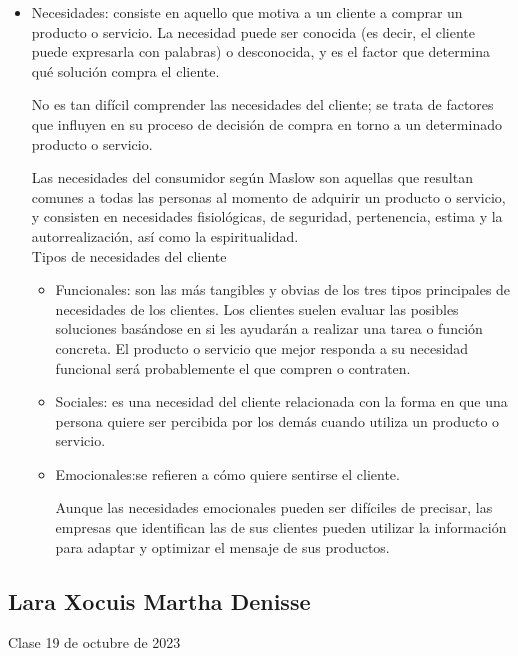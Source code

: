 \documentclass[letterpaper,12pt]{article}
\begin{document}
\begin{sloppypar}
\begin{itemize}
    \item Necesidades:  consiste en aquello que motiva a un cliente a comprar un producto o servicio. La necesidad puede ser conocida (es decir, el cliente puede expresarla con palabras) o desconocida, y es el factor que determina qué solución compra el cliente.
    
    No es tan difícil comprender las necesidades del cliente; se trata de factores que influyen en su proceso de decisión de compra en torno a un determinado producto o servicio.

    Las necesidades del consumidor según Maslow son aquellas que resultan comunes a todas las personas al momento de adquirir un producto o servicio, y consisten en necesidades fisiológicas, de seguridad, pertenencia, estima y la autorrealización, así como la espiritualidad.
    \vspace{0.3cm}\\ 
    Tipos de necesidades del cliente 
    \begin{itemize}
        \item Funcionales: son las más tangibles y obvias de los tres tipos principales de necesidades de los clientes. Los clientes suelen evaluar las posibles soluciones basándose en si les ayudarán a realizar una tarea o función concreta. El producto o servicio que mejor responda a su necesidad funcional será probablemente el que compren o contraten.
        \item Sociales:  es una necesidad del cliente relacionada con la forma en que una persona quiere ser percibida por los demás cuando utiliza un producto o servicio. 
        \item Emocionales:se refieren a cómo quiere sentirse el cliente.

        Aunque las necesidades emocionales pueden ser difíciles de precisar, las empresas que identifican las de sus clientes pueden utilizar la información para adaptar y optimizar el mensaje de sus productos.
    \end{itemize}

\end{itemize}
\newpage
\subsection*{Lara Xocuis Martha Denisse}
Clase 19 de octubre de 2023


\end{sloppypar}
\end{document}
